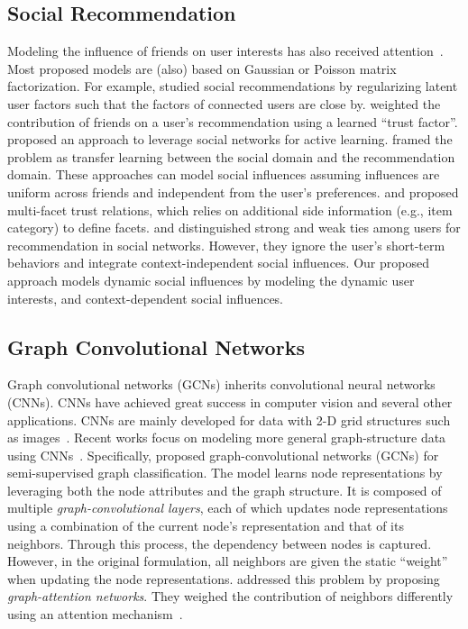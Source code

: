 \documentclass[sigconf]{acmart}
\begin{document}
\subsection{Social Recommendation}
Modeling the influence of friends on user interests has also received attention~\cite{massa2007trust,ma2008sorec,ma2011recommender,jamali2010matrix,jiang2012social}. Most proposed models are (also) based on Gaussian or Poisson matrix factorization. For example, \citet{ma2011recommender} studied social recommendations by regularizing latent user factors such that the factors of connected users are close by.
\citet{chaney2015probabilistic} weighted the contribution of friends on a user's recommendation using a learned ``trust factor''. 
\citet{zhao2014leveraging} proposed an approach to leverage social networks for active learning. 
\citet{xiao2017learning} framed the problem as transfer learning between the social domain and the recommendation domain. These approaches can model social influences assuming influences are uniform across friends and independent from the user's preferences. 
\citet{tang2012etrust} and \citet{tang2012mtrust} proposed multi-facet trust relations, which relies on additional side information (e.g., item category) to define facets. \citet{wang2016social} and \citet{wang2017learning} distinguished strong and weak ties among users for recommendation in social networks. However, they ignore the user's short-term behaviors and integrate context-independent social influences.
Our proposed approach models dynamic social influences by modeling the dynamic user interests, and context-dependent social influences.

\subsection{Graph Convolutional Networks}
Graph convolutional networks (GCNs) inherits convolutional neural networks (CNNs).
CNNs have achieved great success in computer vision and several other applications. CNNs are mainly developed for data with 2-D grid structures such as images~\cite{krizhevsky2012imagenet}. 
Recent works focus on modeling more general graph-structure data using CNNs~\cite{bruna2013spectral,henaff2015deep,defferrard2016convolutional,kipf2016semi}. Specifically, \citet{kipf2016semi} proposed graph-convolutional networks (GCNs) for semi-supervised graph classification. The model learns node representations by leveraging both the node attributes and the graph structure. It is composed of multiple \emph{graph-convolutional layers}, each of which updates node representations using a combination of the current node's representation and that of its neighbors. Through this process, the dependency between nodes is captured. However, in the original formulation, all neighbors are given the static ``weight'' when updating the node representations. \citet{Velickovic2018graph} addressed this problem by proposing \emph{graph-attention networks}. They weighed the contribution of neighbors differently using an attention mechanism~\cite{bahdanau2015neural,xu2015show}.
\end{document}
